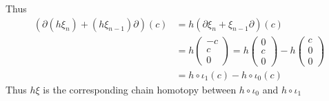 \documentclass[12pt]{article}
\begin{document}
Thus 
\[
\begin{aligned}
\left(\partial(h\xi_n)+(h\xi_{n-1})\partial\right)(c)
&=h(\partial\xi_n+\xi_{n-1}\partial)(c) \\
&=h\begin{pmatrix}
-c \\
c \\
0
\end{pmatrix}
=h\begin{pmatrix}
0 \\
c \\
0
\end{pmatrix}
-h\begin{pmatrix}
c \\
0 \\
0
\end{pmatrix} \\
&=h\circ\iota_1(c)-h\circ\iota_0(c)
\end{aligned}
\]
Thus $h\xi$ is the corresponding chain homotopy between $h\circ\iota_0$ and $h\circ\iota_1$ \par
\end{document}
